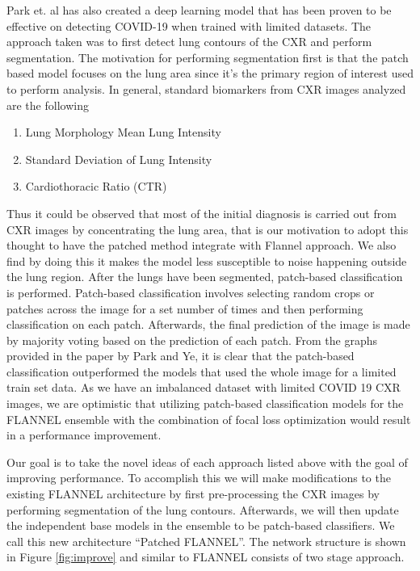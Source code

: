 \documentclass{sigkddExp}
\begin{document}
Park et. al \cite{pmid32396075} has also created a deep learning model that has
been proven to be effective on detecting COVID-19 when trained with limited
datasets. The approach taken was to first detect lung contours of the CXR and
perform segmentation. The motivation for performing segmentation first is that
the patch based model focuses on the lung area since it’s the primary region of
interest used to perform analysis.  In general, standard biomarkers
\cite{pmid32396075} from CXR images analyzed are the following
\begin{enumerate}
    \item Lung Morphology Mean Lung Intensity
    \item Standard Deviation of Lung Intensity
    \item Cardiothoracic Ratio (CTR)
\end{enumerate}

Thus it could be observed that most of the initial diagnosis is carried out from
CXR images by concentrating the lung area, that is our motivation to adopt this
thought to have the patched method integrate with Flannel approach. We also find
by doing this it makes the model less susceptible to noise happening outside the
lung region. After the lungs have been segmented, patch-based classification is
performed. Patch-based classification involves selecting random crops or patches
across the image for a set number of times and then performing classification on
each patch. Afterwards, the final prediction of the image is made by majority
voting based on the prediction of each patch. From the graphs provided in the
paper \cite{pmid32396075} by Park and Ye, it is clear that the patch-based
classification outperformed the models that used the whole image for a limited
train set data. As we have an imbalanced dataset with limited COVID 19 CXR
images, we are optimistic that utilizing patch-based classification models for
the FLANNEL ensemble with the combination of focal loss optimization would
result in a performance improvement.

Our goal is to take the novel ideas of each approach listed above with the goal
of improving performance. To accomplish this we will make modifications to the
existing FLANNEL architecture by first pre-processing the CXR images by
performing segmentation of the lung contours. Afterwards, we will then update
the independent base models in the ensemble to be patch-based classifiers. We
call this new architecture “Patched FLANNEL”. The network structure is shown in
Figure \ref{fig:improve} and similar to FLANNEL consists of two stage approach.
\end{document}
